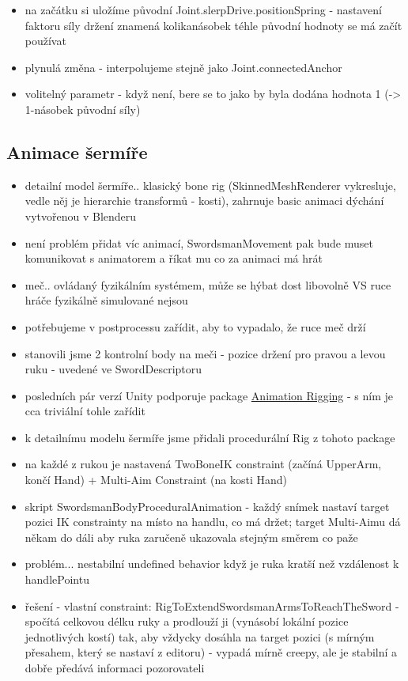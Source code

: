 \begin{itemize}
\begin{itemize}
\begin{itemize}
        \item na začátku si uložíme původní Joint.slerpDrive.positionSpring - nastavení faktoru síly držení znamená kolikanásobek téhle původní hodnoty se má začít používat
        \item plynulá změna - interpolujeme stejně jako Joint.connectedAnchor
        \item volitelný parametr - když není, bere se to jako by byla dodána hodnota 1 (-> 1-násobek původní síly)
      \end{itemize}
  \end{itemize}

\end{itemize}

\subsection{Animace šermíře} \label{swordsmanAnimationSubsection}
\begin{itemize}
  \item detailní model šermíře.. klasický bone rig (SkinnedMeshRenderer vykresluje, vedle něj je hierarchie transformů - kosti), zahrnuje basic animaci dýchání vytvořenou v Blenderu
  \item není problém přidat víc animací, SwordsmanMovement pak bude muset komunikovat s animatorem a říkat mu co za animaci má hrát
  \item meč.. ovládaný fyzikálním systémem, může se hýbat dost libovolně VS ruce hráče fyzikálně simulované nejsou
  \item potřebujeme v postprocessu zařídit, aby to vypadalo, že ruce meč drží
  \item stanovili jsme 2 kontrolní body na meči - pozice držení pro pravou a levou ruku - uvedené ve SwordDescriptoru
  \item posledních pár verzí Unity podporuje package \href{https://docs.unity3d.com/Packages/com.unity.animation.rigging@1.3/manual/index.html}{Animation Rigging} - s ním je cca triviální tohle zařídit
  \item k detailnímu modelu šermíře jsme přidali procedurální Rig z tohoto package
  \item na každé z rukou je nastavená TwoBoneIK constraint (začíná UpperArm, končí Hand) + Multi-Aim Constraint (na kosti Hand)
  \item skript SwordsmanBodyProceduralAnimation - každý snímek nastaví target pozici IK constrainty na místo na handlu, co má držet; target Multi-Aimu dá někam do dáli aby ruka zaručeně ukazovala stejným směrem co paže 
  \item problém... nestabilní undefined behavior když je ruka kratší než vzdálenost k handlePointu
  \item řešení - vlastní constraint: RigToExtendSwordsmanArmsToReachTheSword - spočítá celkovou délku ruky a prodlouží ji (vynásobí lokální pozice jednotlivých kostí) tak, aby vždycky dosáhla na target pozici (s mírným přesahem, který se nastaví z editoru) - vypadá mírně creepy, ale je stabilní a dobře předává informaci pozorovateli
\end{itemize}


